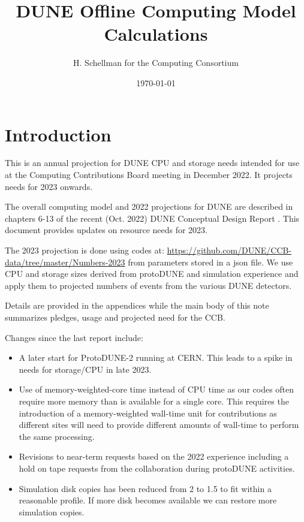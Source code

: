 \documentclass[12pt]{article}
\title{DUNE Offline Computing Model Calculations}
\author{H. Schellman for the Computing Consortium}
\date{\today}
\begin{document}
\makeatletter
{}
\makeatother
\newcommand{\csvautotabularright}[2][]{\csvloop{autotabularright={#2},#1}}

\maketitle
\section{Introduction}

This is an annual projection for DUNE CPU and storage needs intended for use at the Computing Contributions Board meeting in December 2022. It projects needs for 2023 onwards. 

The overall computing model  and 2022 projections for DUNE are described in chapters 6-13 of the recent (Oct. 2022) DUNE Conceptual Design Report \cite{DUNE:2022fcw}.   This document provides updates on resource needs for 2023. 

The 2023 projection is done using codes at: \href{https://github.com/DUNE/CCB-data/tree/master/Numbers-2023}{https://github.com/DUNE/CCB-data/tree/master/Numbers-2023} from parameters stored in a json file. We use CPU and storage sizes derived from protoDUNE and simulation experience and apply them to projected numbers of events from the various DUNE detectors. 

Details are provided in the appendices while the main body of this note summarizes pledges, usage and projected need for the CCB.




Changes since the last report include:

\begin{itemize}
\item A later start for ProtoDUNE-2 running at CERN. This leads to a spike in needs for storage/CPU in late 2023. 
\item Use of memory-weighted-core time instead of CPU time as our codes often require more memory than is available for a single core.   This requires the introduction of a memory-weighted wall-time unit for contributions  as different sites will  need to provide different amounts of wall-time to perform the same processing. 
\item Revisions to near-term requests based on the 2022 experience including a hold on tape requests from the collaboration during protoDUNE activities. 
\item Simulation disk copies has been reduced from 2 to 1.5 to fit within a reasonable profile.  If more disk becomes available we can restore more simulation copies.  
\end{itemize}
\end{document}

